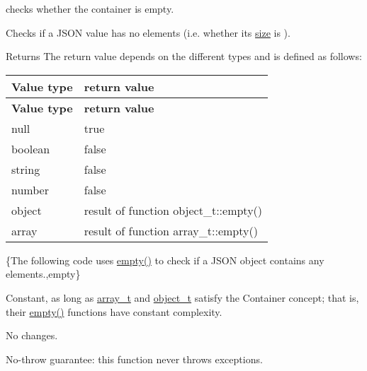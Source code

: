 checks whether the container is empty. 

Checks if a J\+S\+ON value has no elements (i.\+e. whether its \mbox{\hyperlink{classnlohmann_1_1basic__json_a25e27ad0c6d53c01871c5485e1f75b96}{size}} is {}).

\begin{DoxyReturn}{Returns}
The return value depends on the different types and is defined as follows\+: \tabulinesep=1mm
\begin{longtabu} spread 0pt [c]{*{2}{|X[-1]}|}
\hline
\rowcolor{\tableheadbgcolor}\textbf{ Value type  }&\textbf{ return value   }\\
\endfirsthead
\hline
\endfoot
\hline
\rowcolor{\tableheadbgcolor}\textbf{ Value type  }&\textbf{ return value   }\\
\endhead
null  &{\ttfamily true}   \\
boolean  &{\ttfamily false}   \\
string  &{\ttfamily false}   \\
number  &{\ttfamily false}   \\
object  &result of function {\ttfamily object\+\_\+t\+::empty()}   \\
array  &result of function {\ttfamily array\+\_\+t\+::empty()}   \\
\end{longtabu}

\end{DoxyReturn}
\{The following code uses {\ttfamily \mbox{\hyperlink{classnlohmann_1_1basic__json_a1a86d444bfeaa9518d2421aedd74444a}{empty()}}} to check if a J\+S\+ON object contains any elements.,empty\}

Constant, as long as \mbox{\hyperlink{classnlohmann_1_1basic__json_ae095578e03df97c5b3991787f1056374}{array\+\_\+t}} and \mbox{\hyperlink{classnlohmann_1_1basic__json_aa1eb13d5aa86f80cbee6c58e90fbaf49}{object\+\_\+t}} satisfy the Container concept; that is, their {\ttfamily \mbox{\hyperlink{classnlohmann_1_1basic__json_a1a86d444bfeaa9518d2421aedd74444a}{empty()}}} functions have constant complexity.

No changes.

No-\/throw guarantee\+: this function never throws exceptions.

